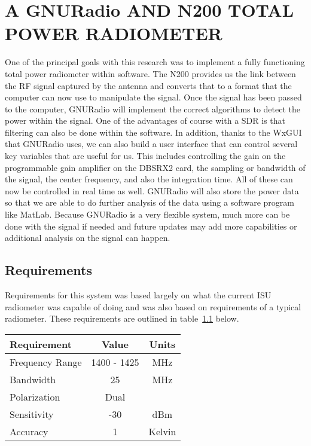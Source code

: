 \chapter{A GNURadio AND N200 TOTAL POWER RADIOMETER}

One of the principal goals with this research was to implement a fully functioning total power radiometer within software.  The N200 provides us the link between the RF signal captured by the antenna and converts that to a format that the computer can now use to manipulate the signal.  Once the signal has been passed to the computer, GNURadio will implement the correct algorithms to detect the power within the signal.  One of the advantages of course with a SDR is that filtering can also be done within the software.  In addition, thanks to the WxGUI that GNURadio uses, we can also build a user interface that can control several key variables that are useful for us.  This includes controlling the gain on the programmable gain amplifier on the DBSRX2 card, the sampling or bandwidth of the signal, the center frequency, and also the integration time.  All of these can now be controlled in real time as well.  GNURadio will also store the power data so that we are able to do further analysis of the data using a software program like MatLab.  Because GNURadio is a very flexible system, much more can be done with the signal if needed and future updates may add more capabilities or additional analysis on the signal can happen.

\section{Requirements}

Requirements for this system was based largely on what the current ISU radiometer was capable of doing and was also based on requirements of a typical radiometer.  These requirements are outlined in table~\ref{requirements} below.


\begin{table}[h!tb] \centering
{}
\label{requirements}
\begin{tabular}{lcc} \hline
\textbf{Requirement} & \textbf{Value} & \textbf{Units} \\ \hline
Frequency Range & 1400 - 1425 & MHz \\
Bandwidth & 25 & MHz \\
Polarization & Dual &  \\ 
Sensitivity & -30 & dBm \\
Accuracy & 1 & Kelvin \\ \hline
\end{tabular}
\end{table}

